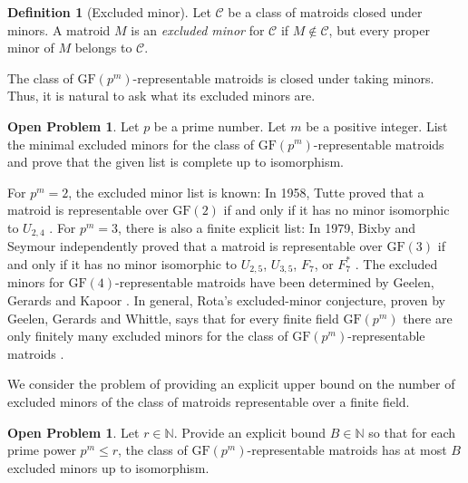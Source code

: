 \documentclass[12pt]{article}
\numberwithin{equation}{section}
\theoremstyle{definition}
\newtheorem{definition}{Definition}
\newtheorem{openproblem}[theorem]{Open Problem}
\newcommand{\N}{\mathbb{N}}
\begin{document}
\begin{definition}[Excluded minor]
Let $\mathcal C$ be a class of matroids closed under minors. A matroid $M$ is an \emph{excluded minor} for $\mathcal C$ if $M\notin \mathcal C$, but every proper minor of $M$ belongs to $\mathcal C$.
\end{definition}

The class of $\mathrm{GF}(p^m)$-representable matroids is closed under taking minors. Thus, it is natural to ask what its excluded minors are.
\begin{openproblem}
Let $p$ be a prime number. Let $m$ be a positive integer. List the minimal excluded minors for the class of $\mathrm{GF}(p^m)$-representable matroids and prove that the given list is complete up to isomorphism.
\end{openproblem}

For $p^m=2$, the excluded minor list is known: In 1958, Tutte proved that a matroid is representable over $\mathrm{GF}(2)$ if and only if it has no minor isomorphic to $U_{2,4}$ \cite{Tutte1958Homotopy}. For $p^m=3$, there is also a finite explicit list: In 1979, Bixby and Seymour independently proved that a matroid is representable over $\mathrm{GF}(3)$ if and only if it has no minor isomorphic to $U_{2,5}$, $U_{3,5}$, $F_7$, or $F_7^*$ \cite{Bixby1979Reid,Seymour1979GF3}.
The excluded minors for $\mathrm{GF}(4)$-representable matroids have been determined by Geelen, Gerards and Kapoor \cite{GeelenGerardsKapoor2000GF4}.
In general, Rota's excluded-minor conjecture, proven by Geelen, Gerards and Whittle, says that for every finite field $\mathrm{GF}(p^m)$ there are only finitely many excluded minors for the class of $\mathrm{GF}(p^m)$-representable matroids \cite{Rota1971Combinatorial, GeelenGerardsWhittle2014Solving}. 

We consider the problem of providing an explicit upper bound on the number of excluded minors of the class of matroids representable over a finite field. 
\begin{openproblem}
Let $r\in \mathbb{N}$. Provide an explicit bound $B\in \N$ so that for each prime power $p^m \leq r$, the class of $\mathrm{GF}(p^m)$-representable matroids has at most $B$ excluded minors up to isomorphism.
\end{openproblem}

\printbibliography
\end{document}

